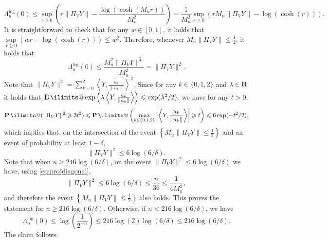 \documentclass[10pt,a4paper]{amsart}
\makeatletter
\newcommand{\E}{\operatorname*{\mathbf{E}}\ilimits@}
\renewcommand{\P}{\operatorname*{\mathbf{P}}\ilimits@}
\newcommand{\R}{\mathbf R}
\renewcommand{\geq}{\geqslant}
\renewcommand{\le}{\leqslant}
\renewcommand{\leq}{\leqslant}
\renewenvironment{proof}[1][\proofname]{\par\pushQED{\qed}\normalfont \topsep6\p@\@plus6\p@\relax\trivlist\item[\hskip\labelsep#1\@addpunct{}]\ignorespaces}{\popQED\endtrivlist\@endpefalse}
\makeatother
\begin{document}
\begin{proof}
\[
\Lambda_n^{\operatorname{log}}(0)
\le
\sup_{r \geq 0}\left(r \|\Pi_{V} Y\| - \frac{\log(\cosh(M_n r))}{M_n^2}\right)
=
\frac{1}{M_n^2} \sup\limits_{r \geq 0}\left(r M_n \|\Pi_{V} Y\| - \log(\cosh(r))\right).
\]
It is straightforward to check that for any $w \in [0,1]$, it holds that
$
\sup\limits_{r \geq 0}(w r - \log(\cosh(r))) \leq w^2.
$
Therefore, whenever $M_n \|\Pi_{V} Y\| \leq \frac{1}{2}$, it holds that
\[
\Lambda_n^{\operatorname{log}}(0) \leq \frac{M_n^2 \|\Pi_{V} Y\|^2}{M_n^2} = \|\Pi_{V} Y\|^2.
\]
Note that
$
\|\Pi_{V} Y\|^2 = \sum_{k = 0}^2 \left\langle Y, \frac{u_k}{\|u_k\|} \right\rangle^2.
$
Since for any $k \in \{0,1,2\}$ and $\lambda \in \R$ it holds that
$
\E\exp\left(\lambda \left\langle Y, \frac{u_k}{\|u_k\|} \right\rangle\right) \leq \exp(\lambda^2/2),
$
we have for any $t > 0$,
\[
\P(\|\Pi_{V} Y\|^2 \geq 3 t^2)
\le
\P\left(\max_{k \in \{0,1,2\}} \left|\left\langle Y, \frac{u_k}{\|u_k\|} \right\rangle\right| \geq t \right)
\le
6\exp(-t^2/2),
\]
which implies that, on the intersection of the event $\left\{M_n \|\Pi_{V} Y\| \leq \frac{1}{2}\right\}$ and an event of probability at least $1-\delta$,
\[
\|\Pi_{V} Y\|^2 \leq 6\log(6/\delta).
\]
Note that when $n \geq 216\log(6/\delta)$, on the event $\|\Pi_{V} Y\|^2 \leq 6\log(6/\delta)$ we have, using \eqref{eq:projdiagonal},
\[
\|\Pi_{V} Y\|^2 \leq 6\log(6/\delta) \leq \frac{n}{36} \leq \frac{1}{4M_n^2},
\]
and therefore the event $\left\{M_n \|\Pi_{V} Y\| \leq \frac{1}{2}\right\}$ also holds. This proves the statement for $n \geq 216\log(6/\delta)$. Otherwise, if $n < 216\log(6/\delta)$, we have
\[
\Lambda_n^{\operatorname{log}}(0) \leq \log\left(\frac{1}{2^{-n}}\right) \leq 216\log(2)\log(6/\delta) \leq 216\log(6/\delta).
\]
The claim follows.
\end{proof}
\end{document}
